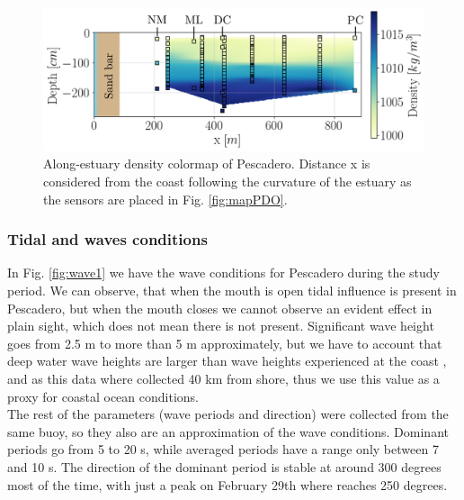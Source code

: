 \documentclass[tesis.tex]{subfiles}
\begin{document}
\begin{figure}[h!]
    \centering
    \includegraphics[scale=0.6]{Imagenes/vista_long2.png}
    \caption{Along-estuary density colormap of Pescadero. Distance x is considered from the coast following the curvature of the estuary as the sensors are placed in Fig. \ref{fig:mapPDO}. }
    \label{fig:perfiles1}
\end{figure}

\subsubsection{Tidal and waves conditions}

In Fig. \ref{fig:wave1} we have the wave conditions for Pescadero during the study period. We can observe, that when the mouth is open tidal influence is present in Pescadero, but when the mouth closes we cannot observe an evident effect in plain sight, which does not mean there is not present. Significant wave height goes from 2.5 m to more than 5 m approximately, but we have to account that deep water wave heights are larger than wave heights experienced at the coast \citep{Williams2014}, and as this data where collected 40 km from shore, thus we use this value as a proxy for coastal ocean conditions.  \\

The rest of the parameters (wave periods and direction) were collected from the same buoy, so they also are an approximation of the wave conditions. Dominant periods go from 5 to 20 s, while averaged periods have a range only between 7 and 10 s. The direction of the dominant period is stable at around 300 degrees most of the time, with just a peak on February 29th where reaches 250 degrees.\\
\end{document}
